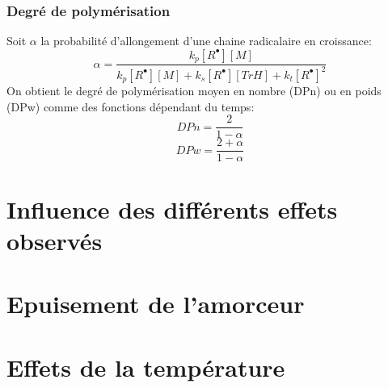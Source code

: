 \documentclass[a4paper,oneside,12pt]{article}
\begin{document}
\section{Degré de polymérisation}
Soit $\alpha$ la probabilité d'allongement d'une chaine radicalaire en croissance: 
$$\alpha=\frac{k_p[R^{\bullet}][M]}{k_p[R^{\bullet}][M]+k_s[R^{\bullet}][TrH]+k_t[R^{\bullet}]^2}$$
On obtient le degré de polymérisation moyen en nombre (DPn) ou en poids (DPw) comme des fonctions dépendant du temps:
$$DPn=\frac{2}{1-\alpha}$$
$$DPw=\frac{2+\alpha}{1-\alpha}$$

\part{Influence des différents effets observés}

\part{Epuisement de l'amorceur}

\part{Effets de la température}
\end{document}
